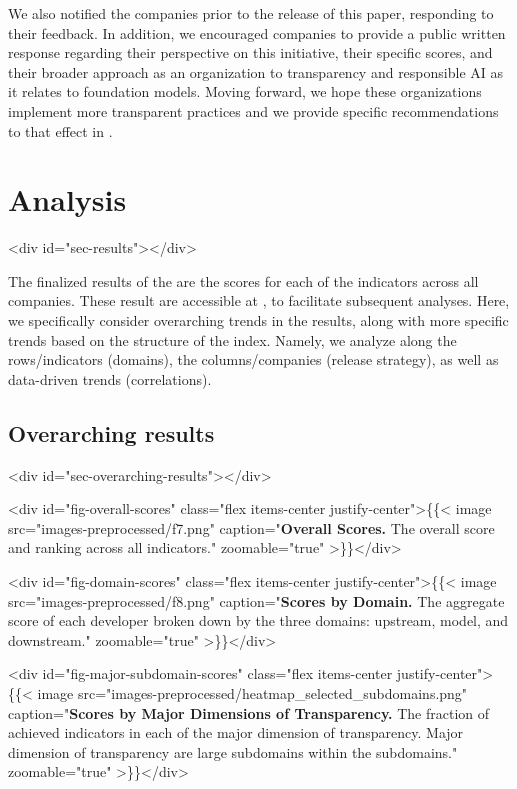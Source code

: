 \documentclass[screen, authorversion, acmsmall]{acmart}
\begin{document}
We also notified the companies prior to the release of this paper, responding to their feedback. 
In addition, we encouraged companies to provide a public written response regarding their perspective on this initiative, their specific scores, and their broader approach as an organization to transparency and responsible AI as it relates to foundation models.
Moving forward, we hope these organizations implement more transparent practices and we provide specific recommendations to that effect in .
\clearpage
\clearpage
\hypertarget{results}{\section{Analysis}}
<div id="sec-results"></div>


The finalized results of the \projectname are the scores for each of the \numindicators indicators across all \numcompanies companies.
These result are accessible at \materialsUrl, to facilitate subsequent analyses.
Here, we specifically consider overarching trends in the results, along with more specific trends based on the structure of the index.
Namely, we analyze along the rows/indicators (\eg domains), the columns/companies (\eg release strategy), as well as data-driven trends (\eg correlations).

\hypertarget{overarching-results}{\subsection{Overarching results}}
<div id="sec-overarching-results"></div>


<div id="fig-overall-scores" class="flex items-center justify-center">\{\{< image src="images-preprocessed/f7.png" caption="\textbf{Overall Scores.} The overall \projectname score and ranking across all \numindicators indicators." zoomable="true" >\}\}</div>



<div id="fig-domain-scores" class="flex items-center justify-center">\{\{< image src="images-preprocessed/f8.png" caption="\textbf{Scores by Domain.} The aggregate score of each developer broken down by the three domains: upstream, model, and downstream." zoomable="true" >\}\}</div>



<div id="fig-major-subdomain-scores" class="flex items-center justify-center">\{\{< image src="images-preprocessed/heatmap_selected_subdomains.png" caption="\textbf{Scores by Major Dimensions of Transparency.}  The fraction of achieved indicators in each of the \nummajorsubdomains major dimension of transparency.  Major dimension of transparency are large subdomains within the \numsubdomains subdomains." zoomable="true" >\}\}</div>
\end{document}
